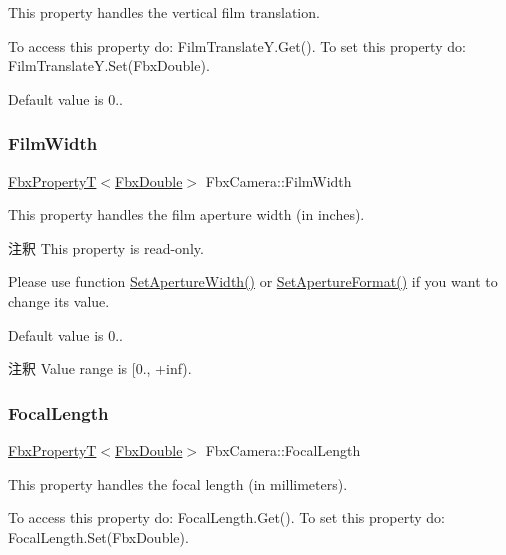This property handles the vertical film translation.

To access this property do\+: Film\+Translate\+Y.\+Get(). To set this property do\+: Film\+Translate\+Y.\+Set(\+Fbx\+Double).

Default value is 0.. \mbox{\label{class_fbx_camera_a54f69a2e295c3c69df559f9b64699be5}} 
\subsubsection{\texorpdfstring{Film\+Width}{FilmWidth}}
{\footnotesize\ttfamily \hyperlink{class_fbx_property_t}{Fbx\+PropertyT}$<$\hyperlink{fbxtypes_8h_a171e72a1c46fc15c1a6c9c31948c1c5b}{Fbx\+Double}$>$ Fbx\+Camera\+::\+Film\+Width}

This property handles the film aperture width (in inches).

\begin{DoxyRemark}{注釈}
This property is read-\/only. 

Please use function \hyperlink{class_fbx_camera_ae927c1d64d3b28cce554d47ac56fdc92}{Set\+Aperture\+Width()} or \hyperlink{class_fbx_camera_a5b644b41e4d72c214acfdb5a2dee7576}{Set\+Aperture\+Format()} if you want to change its value.
\end{DoxyRemark}
Default value is 0.. \begin{DoxyRemark}{注釈}
Value range is \mbox{[}0., +inf). 
\end{DoxyRemark}
\mbox{\label{class_fbx_camera_afee5193f8423491a47a059d93cee61c3}} 
\subsubsection{\texorpdfstring{Focal\+Length}{FocalLength}}
{\footnotesize\ttfamily \hyperlink{class_fbx_property_t}{Fbx\+PropertyT}$<$\hyperlink{fbxtypes_8h_a171e72a1c46fc15c1a6c9c31948c1c5b}{Fbx\+Double}$>$ Fbx\+Camera\+::\+Focal\+Length}

This property handles the focal length (in millimeters).

To access this property do\+: Focal\+Length.\+Get(). To set this property do\+: Focal\+Length.\+Set(\+Fbx\+Double).

